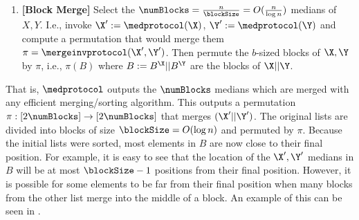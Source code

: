 \begin{enumerate}
\item \label{highlevelapproach1} \textbf{[Block Merge]} Select the $\numBlocks=\frac{n}{\blockSize}=O(\frac{n}{\log n})$ medians of $X,Y$. I.e., invoke $\X':=\medprotocol(\X)$, $ \Y':=\medprotocol(\Y)$ and compute a permutation that would merge them $\pi=\mergeinvprotocol(\X',\Y')$. %
Then permute the $b$-sized blocks of $\X,\Y$ by $\pi$, i.e., $\pi(B)$ where $B:= B^{\X}||B^{\Y}$ are the blocks of $\X||\Y$.
\end{enumerate}
That is, $\medprotocol$ outputs the $\numBlocks$ medians which are merged with any efficient merging/sorting algorithm. This outputs a permutation $\pi : [2\numBlocks] \rightarrow [2\numBlocks]$ that merges $(\X'||\Y')$. The original lists are divided into blocks of size $\blockSize=O(\log n)$ and permuted by $\pi$. Because the initial lists were sorted, most elements in $B$ are now close to their final position. For example, it is easy to see that the location of the $\X',\Y'$ medians in $B$ will be at most $\blockSize-1$ positions from their final position. However, it is possible for some elements to be far from their final position when many blocks from the other list merge into the middle of a block. An example of this can be seen in . %

